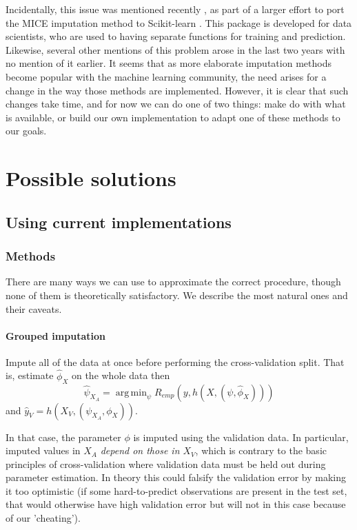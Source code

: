 \documentclass[12pt, a4paper]{memoir}
\DeclareMathOperator*{\argmin}{arg\,min}
\begin{document}
Incidentally, this issue was mentioned recently \cite{github_sklearn}, as part of a larger effort to port the MICE \cite{MICE_founding} imputation method to Scikit-learn \cite{scikit-learn}. This package is developed for data scientists, who are used to having separate functions for training and prediction. Likewise, several other mentions of this problem arose in the last two years \cite{thread_newdata1}\cite{thread_newdata2}\cite{thread_newdata3} with no mention of it earlier. It seems that as more elaborate imputation methods become popular with the machine learning community, the need arises for a change in the way those methods are implemented. However, it is clear that such changes take time, and for now we can do one of two things: make do with what is available, or build our own implementation to adapt one of these methods to our goals.
	\section{Possible solutions}
		\subsection{Using current implementations}
			\subsubsection{Methods}
There are many ways we can use to approximate the correct procedure, though none of them is theoretically satisfactory. We describe the most natural ones and their caveats.

\paragraph{Grouped imputation} Impute all of the data at once before performing the cross-validation split. That is, estimate $\hat{\phi}_X$ on the whole data then $$\hat{\psi}_{X_A} = \argmin_{\psi} R_{emp}(y, h(X, (\psi, \hat{\phi}_X)))$$
 and $\hat{y}_V = h(X_V, (\psi_{X_A}, \phi_X))$. 

In that case, the parameter $\phi$ is imputed using the validation data. In particular, imputed values in $X_A$ \emph{depend on those in $X_V$}, which is contrary to the basic principles of cross-validation where validation data must be held out during parameter estimation. In theory this could falsify the validation error by making it too optimistic (if some hard-to-predict observations are present in the test set, that would otherwise have high validation error but will not in this case because of our 'cheating').
\end{document}
